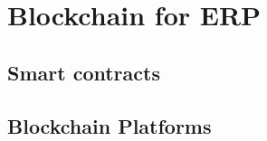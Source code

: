 \chapter{Blockchain for ERP}
\label{ch:blockchain-for-erp}

\section{Smart contracts}


\section{Blockchain Platforms}